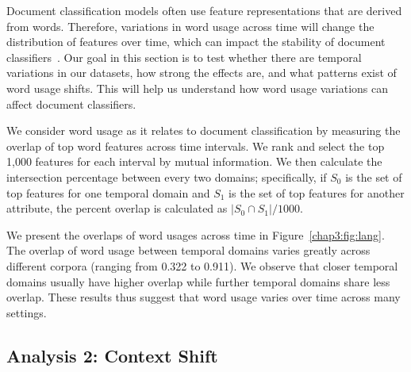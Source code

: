 Document classification models often use feature representations that are derived from words. Therefore, variations in word usage across time will change the distribution of features over time, which can impact the stability of document classifiers~\cite{huang2018examining}. 
Our goal in this section is to test whether there are temporal variations in our datasets, how strong the effects are, and what patterns exist of word usage shifts. This will help us understand how word usage variations can affect document classifiers.

We consider word usage as it relates to document classification by measuring the overlap of top word features across time intervals. We rank and select the top 1,000 features for each interval by mutual information. We then calculate the intersection percentage between every two domains; 
specifically, if $S_0$ is the set of top features for one temporal domain and $S_1$ is the set of top features for another attribute, the percent overlap is calculated as $|S_0 \cap S_1|/1000$.

We present the overlaps of word usages across time in Figure~\ref{chap3:fig:lang}.
The overlap of word usage between temporal domains varies greatly across different corpora (ranging from 0.322 to 0.911). We observe that closer temporal domains usually have higher overlap while further temporal domains share less overlap. These results thus suggest that word usage varies over time across many settings.


\subsection{Analysis 2: Context Shift}
\label{chap3:subsec:ctt_shift}

